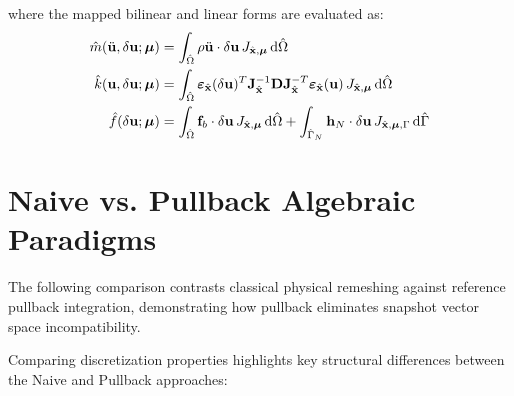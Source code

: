 where the mapped bilinear and linear forms are evaluated as:
\begin{align}
    \hat{m}(\ddot{\mathbf{u}}, \delta\mathbf{u}; \boldsymbol{\mu}) & = \int_{\hat{\Omega}} \rho \ddot{\mathbf{u}} \cdot \delta\mathbf{u} \, J_{\hat{\mathbf{x}}, \boldsymbol{\mu}} \, \mathrm{d}\hat{\Omega}                                                                                                                                                 \\
    \hat{k}(\mathbf{u}, \delta\mathbf{u}; \boldsymbol{\mu})        & = \int_{\hat{\Omega}} \boldsymbol{\varepsilon}_{\hat{\mathbf{x}}}(\delta\mathbf{u})^T \mathbf{J}_{\hat{\mathbf{x}}}^{-1} \mathbf{D} \mathbf{J}_{\hat{\mathbf{x}}}^{-T} \boldsymbol{\varepsilon}_{\hat{\mathbf{x}}}(\mathbf{u}) \, J_{\hat{\mathbf{x}}, \boldsymbol{\mu}} \, \mathrm{d}\hat{\Omega} \\
    \hat{f}(\delta\mathbf{u}; \boldsymbol{\mu})                  & = \int_{\hat{\Omega}} \mathbf{f}_b \cdot \delta\mathbf{u} \, J_{\hat{\mathbf{x}}, \boldsymbol{\mu}} \, \mathrm{d}\hat{\Omega} + \int_{\hat{\Gamma}_N} \mathbf{h}_N \cdot \delta\mathbf{u} \, J_{\hat{\mathbf{x}}, \boldsymbol{\mu}, \Gamma} \, \mathrm{d}\hat{\Gamma}
\end{align}

\section{Naive vs. Pullback Algebraic Paradigms}

The following comparison contrasts classical physical remeshing against reference pullback integration, demonstrating how pullback eliminates snapshot vector space incompatibility.

Comparing discretization properties highlights key structural differences between the Naive and Pullback approaches:

